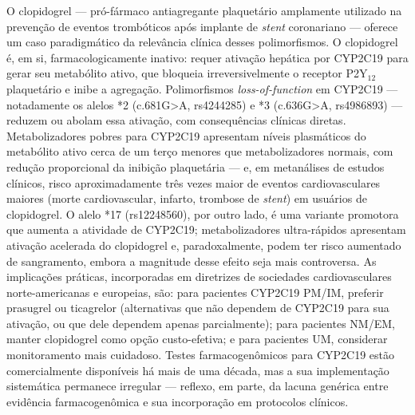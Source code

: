 O clopidogrel --- pró-fármaco antiagregante plaquetário amplamente utilizado na prevenção de eventos trombóticos após implante de \emph{stent} coronariano --- oferece um caso paradigmático da relevância clínica desses polimorfismos. O clopidogrel é, em si, farmacologicamente inativo: requer ativação hepática por CYP2C19 para gerar seu metabólito ativo, que bloqueia irreversivelmente o receptor P2Y$_{12}$ plaquetário e inibe a agregação. Polimorfismos \emph{loss-of-function} em CYP2C19 --- notadamente os alelos *2 (c.681G>A, rs4244285) e *3 (c.636G>A, rs4986893) --- reduzem ou abolam essa ativação, com consequências clínicas diretas. Metabolizadores pobres para CYP2C19 apresentam níveis plasmáticos do metabólito ativo cerca de um terço menores que metabolizadores normais, com redução proporcional da inibição plaquetária --- e, em metanálises de estudos clínicos, risco aproximadamente três vezes maior de eventos cardiovasculares maiores (morte cardiovascular, infarto, trombose de \emph{stent}) em usuários de clopidogrel. O alelo *17 (rs12248560), por outro lado, é uma variante promotora que aumenta a atividade de CYP2C19; metabolizadores ultra-rápidos apresentam ativação acelerada do clopidogrel e, paradoxalmente, podem ter risco aumentado de sangramento, embora a magnitude desse efeito seja mais controversa. As implicações práticas, incorporadas em diretrizes de sociedades cardiovasculares norte-americanas e europeias, são: para pacientes CYP2C19 PM/IM, preferir prasugrel ou ticagrelor (alternativas que não dependem de CYP2C19 para sua ativação, ou que dele dependem apenas parcialmente); para pacientes NM/EM, manter clopidogrel como opção custo-efetiva; e para pacientes UM, considerar monitoramento mais cuidadoso. Testes farmacogenômicos para CYP2C19 estão comercialmente disponíveis há mais de uma década, mas a sua implementação sistemática permanece irregular --- reflexo, em parte, da lacuna genérica entre evidência farmacogenômica e sua incorporação em protocolos clínicos.


